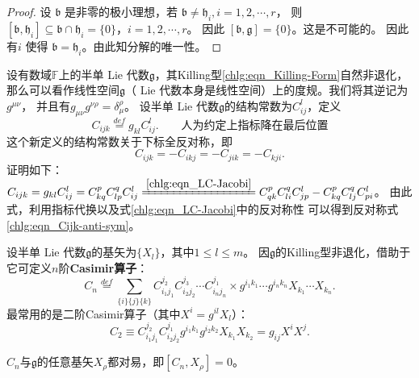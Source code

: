 \begin{proof}
    设 $\mathfrak{b}$ 是非零的极小理想，若 $\mathfrak{b} \neq \mathfrak{h}_i, i=1,2, \cdots, r$，
    则 $\left[\mathfrak{b}, \mathfrak{h}_i\right] \subseteq \mathfrak{b} \cap \mathfrak{h}_i=\{0\}$，$i=1,2, \cdots, r$。
    因此 $[\mathfrak{b}, \mathfrak{g}]=\{0\}$。这是不可能的。
    因此有$i$ 使得 $\mathfrak{b}=\mathfrak{h}_i$。由此知分解的唯一性。
\end{proof}



设有数域$\mathbb{F}$上的半单 Lie 代数$\mathfrak{g}$，其Killing型\eqref{chlg:eqn_Killing-Form}自然非退化，
那么可以看作线性空间$\mathfrak{g}$（ Lie 代数本身是线性空间）上的度规。我们将其逆记为$g^{\mu\nu}$，
并且有$g_{\mu\nu}g^{\nu\rho}=\delta^\rho_\mu$。
设半单 Lie 代数$\mathfrak{g}$的结构常数为$C_{ij}^l$，定义
\begin{equation}
    C_{ijk} \overset{def}{=} g_{kl} C_{ij}^l .
    \qquad \text{人为约定上指标降在最后位置}
\end{equation}
这个新定义的结构常数关于下标全反对称，即
\begin{equation}\label{chlg:eqn_Cijk-anti-sym}
    C_{ijk} = -C_{ikj} = -C_{jik} = -C_{kji} .
\end{equation}
证明如下：
$    C_{ijk} =  g_{kl} C_{ij}^l = C^p_{kq} C^q_{lp} C_{ij}^l
\xlongequal{\ref{chlg:eqn_LC-Jacobi}}
C^p_{qk} C^q_{li} C_{jp}^l -C^p_{kq} C^q_{lj} C_{pi}^l $。
由此式，利用指标代换以及式\eqref{chlg:eqn_LC-Jacobi}中的反对称性
可以得到反对称式\eqref{chlg:eqn_Cijk-anti-sym}。





设半单 Lie 代数$\mathfrak{g}$的基矢为$\{X_l\}$，其中$1\leqslant l \leqslant m$。
因$\mathfrak{g}$的Killing型非退化，借助于它可定义$n$阶{\bfseries \heiti Casimir算子}：
\begin{equation}\label{chlg:eqn_Casimir}
    C_n \overset{def}{=} \sum_{\{i\}\{j\}\{k\}}
    C_{i_1 j_1} ^{j_2} C_{i_2 j_2} ^{j_3}\cdots C_{i_n j_n} ^{j_1} 
    \times g^{i_1 k_1} \cdots g^{i_n k_n} X_{k_1} \cdots X_{k_n} .
\end{equation}
最常用的是二阶Casimir算子（其中$X^i=g^{il}X_l$）：
\begin{equation}\label{chlg:eqn_Casimir2}
    C_2 \equiv C_{i_1 j_1} ^{j_2} C_{i_2 j_2} ^{j_1}
    g^{i_1 k_1} g^{i_2 k_2} X_{k_1} X_{k_2} 
    = g_{ij} X^i X^j.
\end{equation}

\begin{theorem}\label{chlg:thm_CX=0}
    $C_n$与$\mathfrak{g}$的任意基矢$X_\rho$都对易，即$[C_n, X_\rho]=0$。
\end{theorem}     

